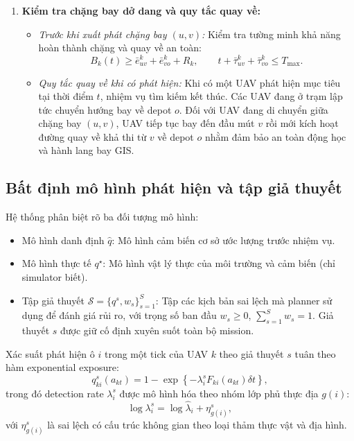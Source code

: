 \documentclass[12pt,a4paper]{article}
\begin{document}
\begin{enumerate}
    \item \textbf{Kiểm tra chặng bay dở dang và quy tắc quay về:}
    \begin{itemize}
        \item \emph{Trước khi xuất phát chặng bay $(u,v)$:} Kiểm tra tường minh khả năng hoàn thành chặng và quay về an toàn:
        \begin{equation}
        B_k(t) \geq \bar{e}_{uv}^k + \bar{e}_{vo}^k + R_k,\qquad t + \bar{\tau}_{uv}^k + \bar{\tau}_{vo}^k \leq T_{\max}.
        \end{equation}
        \item \emph{Quy tắc quay về khi có phát hiện:} Khi có một UAV phát hiện mục tiêu tại thời điểm $t$, nhiệm vụ tìm kiếm kết thúc. Các UAV đang ở trạm lập tức chuyển hướng bay về depot $o$. Đối với UAV đang di chuyển giữa chặng bay $(u, v)$, UAV tiếp tục bay đến đầu mút $v$ rồi mới kích hoạt đường quay về khả thi từ $v$ về depot $o$ nhằm đảm bảo an toàn động học và hành lang bay GIS.
    \end{itemize}
\end{enumerate}

\subsection{Bất định mô hình phát hiện và tập giả thuyết}

Hệ thống phân biệt rõ ba đối tượng mô hình:
\begin{itemize}
    \item Mô hình danh định $\widehat q$: Mô hình cảm biến cơ sở ước lượng trước nhiệm vụ.
    \item Mô hình thực tế $q^\star$: Mô hình vật lý thực của môi trường và cảm biến (chỉ simulator biết).
    \item Tập giả thuyết $\mathcal{S} = \{q^s, w_s\}_{s=1}^S$: Tập các kịch bản sai lệch mà planner sử dụng để đánh giá rủi ro, với trọng số ban đầu $w_s \geq 0$, $\sum_{s=1}^S w_s = 1$. Giả thuyết $s$ được giữ cố định xuyên suốt toàn bộ mission.
\end{itemize}

Xác suất phát hiện ô $i$ trong một tick của UAV $k$ theo giả thuyết $s$ tuân theo hàm exponential exposure:
\begin{equation}
q^s_{ki}(a_{kt}) = 1 - \exp\left\{ -\lambda_i^s F_{ki}(a_{kt})\delta t \right\},
\end{equation}
trong đó detection rate $\lambda_i^s$ được mô hình hóa theo nhóm lớp phủ thực địa $g(i)$:
\begin{equation}
\log \lambda_i^s = \log \widehat \lambda_i + \eta_{g(i)}^s,
\end{equation}
với $\eta_{g(i)}^s$ là sai lệch có cấu trúc không gian theo loại thảm thực vật và địa hình.
\end{document}
